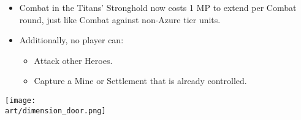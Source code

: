 \begin{multicols*}{2}
\begin{itemize}
  \item Combat in the Titans' Stronghold now costs 1 MP to extend per Combat round, just like Combat against non-Azure tier units.
  \item Additionally, no player can:
  \begin{itemize}
    \item Attack other Heroes.
    \item Capture a Mine or Settlement that is already controlled.
  \end{itemize}
\end{itemize}

\vspace*{\fill}

\begin{center}
  \texttt{[image: \\art/dimension\_door.png]}
\end{center}

\vspace*{\fill}

\end{multicols*}

\newpage

